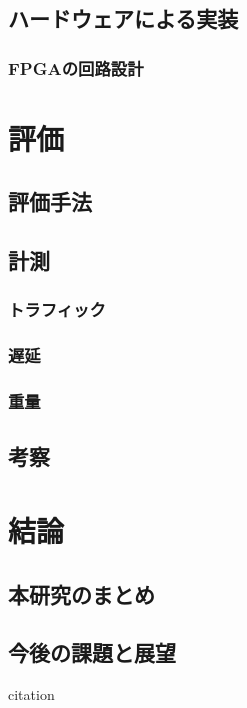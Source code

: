 \section{ハードウェアによる実装}
\subsection{FPGAの回路設計}

\chapter{評価}
\label{chap:evaluation}
\section{評価手法}
\section{計測}
\subsection{トラフィック}
\subsection{遅延}
\subsection{重量}
\section{考察}

\chapter{結論}
\label{chap:conclusion}
\section{本研究のまとめ}
\section{今後の課題と展望}

citation\cite{hoge09}
